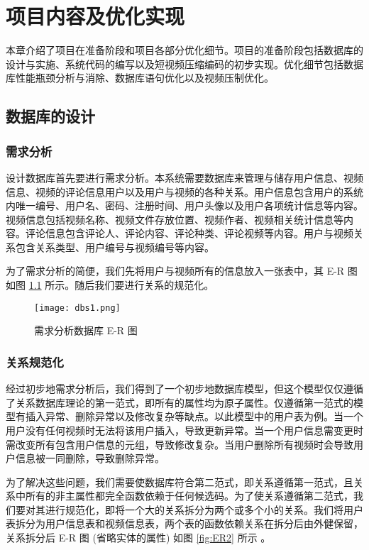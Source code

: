 \chapter{项目内容及优化实现}\label{sec:algorithm}

本章介绍了项目在准备阶段和项目各部分优化细节。项目的准备阶段包括数据库的设计与实施、系统代码的编写以及短视频压缩编码的初步实现。优化细节包括数据库性能瓶颈分析与消除、数据库语句优化以及视频压制优化。

\section{数据库的设计}
 
\subsection{需求分析}
设计数据库首先要进行需求分析\cite{gamma1995design}。本系统需要数据库来管理与储存用户信息、视频信息、视频的评论信息用户以及用户与视频的各种关系。用户信息包含用户的系统内唯一编号、用户名、密码、注册时间、用户头像以及用户各项统计信息等内容。视频信息包括视频名称、视频文件存放位置、视频作者、视频相关统计信息等内容。评论信息包含评论人、评论内容、评论种类、评论视频等内容。用户与视频关系包含关系类型、用户编号与视频编号等内容。

为了需求分析的简便，我们先将用户与视频所有的信息放入一张表中，其 E-R 图如图 \ref{fig:ER1} 所示。随后我们要进行关系的规范化。

\begin{figure}[!ht]
    \centering
    \texttt{[image: dbs1.png]}
    \caption{需求分析数据库 E-R 图}
    \label{fig:ER1}
\end{figure}


\subsection{关系规范化}

经过初步地需求分析后，我们得到了一个初步地数据库模型，但这个模型仅仅遵循了关系数据库理论的第一范式\cite{codd1972further}，即所有的属性均为原子属性。仅遵循第一范式的模型有插入异常、删除异常以及修改复杂等缺点。以此模型中的用户表为例。当一个用户没有任何视频时无法将该用户插入，导致更新异常。当一个用户信息需变更时需改变所有包含用户信息的元组，导致修改复杂。当用户删除所有视频时会导致用户信息被一同删除，导致删除异常。

为了解决这些问题，我们需要使数据库符合第二范式\cite{codd1972further}，即关系遵循第一范式，且关系中所有的非主属性都完全函数依赖于任何候选码。为了使关系遵循第二范式，我们要对其进行规范化，即将一个大的关系拆分为两个或多个小的关系。我们将用户表拆分为用户信息表和视频信息表，两个表的函数依赖关系在拆分后由外健保留，关系拆分后 E-R 图 (省略实体的属性) 如图 \ref{fig:ER2} 所示 。

